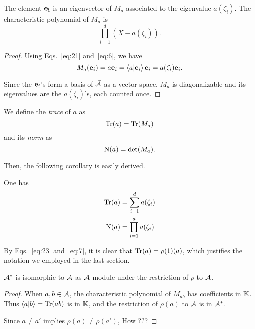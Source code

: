 \begin{theorem}[Stickelberger]
  \label{th:stickelberger}
  The element $\mathbf{e_i}$ is an eigenvector of $M_a$ associated to
  the eigenvalue $a(\zeta_i)$. The characteristic polynomial of $M_a$
  is
  \[\prod_{i=1}^d(X-a(\zeta_i))\text{.}\]
\end{theorem}
\begin{proof}
  Using Eqs.~\eqref{eq:21} and~\eqref{eq:6}, we have
  \begin{equation}
    \label{eq:19}
    M_a(\mathbf{e}_i) = a\mathbf{e}_i = \left\langle a \middle| \mathbf{e}_i \right\rangle\mathbf{e}_i=a(\zeta_i)\mathbf{e}_i
    \text{.}
  \end{equation}

  Since the $\mathbf{e}_i$'s form a basis of $\bar{\mathcal{A}}$ as a
  vector space, $M_a$ is diagonalizable and its eigenvalues are the
  $a(\zeta_i)$'s, each counted once.
\end{proof}

\begin{definition}
  \label{def:trace}
  We define the \emph{trace} of $a$ as
  \[\operatorname{Tr}(a) = \operatorname{Tr}(M_a)\]
  and its \emph{norm} as
  \[\operatorname{N}(a) = \det(M_a)\text{.}\]
\end{definition}
Then, the following corollary is easily derived.

\begin{corollary}
  \label{th:stickelberger-trace-det}
  One has
  \begin{align}
    \label{eq:23}
    \operatorname{Tr}(a) &= \sum_{i=1}^da(\zeta_i)\\
    \label{eq:24}
    \operatorname{N}(a) &= \prod_{i=1}^da(\zeta_i)
  \end{align}
\end{corollary}

By Eqs.~\eqref{eq:23} and~\eqref{eq:7}, it is clear that
$\operatorname{Tr}(a)=\rho(1)(a)$, which justifies the notation we employed in the
last section. 

\begin{theorem}
  $\mathcal{A}^\ast$ is isomorphic to $\mathcal{A}$ as
  $\mathcal{A}$-module under the restriction of $\rho$ to $\mathcal{A}$.
\end{theorem}
\begin{proof}
  When $a,b\in\mathcal{A}$, the characteristic polynomial of $M_{ab}$
  has coefficients in $\mathbb{K}$. Thus $\left\langle a \middle| b \right\rangle=\operatorname{Tr}(ab)$ is in $\mathbb{K}$,
  and the restriction of $\rho(a)$ to $\mathcal{A}$ is in
  $\mathcal{A}^\ast$.

  Since $a\ne a'$ implies $\rho(a)\ne\rho(a')$, How ???
\end{proof}


